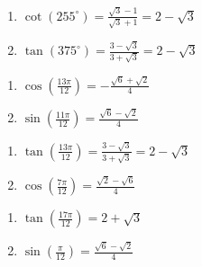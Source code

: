 \documentclass{ximera}
\begin{document}
\begin{multicols}{2}

\begin{enumerate}

\setcounter{enumi}{\value{HW}}

\item  $\cot(255^{\circ}) = \frac{\sqrt{3}-1}{\sqrt{3}+1} = 2-\sqrt{3}$
\item  $\tan(375^{\circ}) = \frac{3-\sqrt{3}}{3+\sqrt{3}} = 2-\sqrt{3}$

\setcounter{HW}{\value{enumi}}

\end{enumerate}

\end{multicols}

\begin{multicols}{2}

\begin{enumerate}

\setcounter{enumi}{\value{HW}}

\item  $\cos\left(\frac{13\pi}{12}\right) = -\frac{\sqrt{6}+\sqrt{2}}{4}$
\item  $\sin\left(\frac{11\pi}{12}\right) = \frac{\sqrt{6} - \sqrt{2}}{4}$

\setcounter{HW}{\value{enumi}}

\end{enumerate}

\end{multicols}

\begin{multicols}{2}

\begin{enumerate}

\setcounter{enumi}{\value{HW}}

\item  $\tan\left(\frac{13\pi}{12}\right) = \frac{3-\sqrt{3}}{3+\sqrt{3}} = 2-\sqrt{3}$
\item $\cos \left( \frac{7\pi}{12} \right) = \frac{\sqrt{2} - \sqrt{6}}{4}$

\setcounter{HW}{\value{enumi}}

\end{enumerate}

\end{multicols}

\begin{multicols}{2}

\begin{enumerate}

\setcounter{enumi}{\value{HW}}

\item $\tan \left( \frac{17\pi}{12} \right) = 2 + \sqrt{3}$
\item $\sin \left( \frac{\pi}{12} \right) = \frac{\sqrt{6} - \sqrt{2}}{4}$

\setcounter{HW}{\value{enumi}}

\end{enumerate}

\end{multicols}
\end{document}
